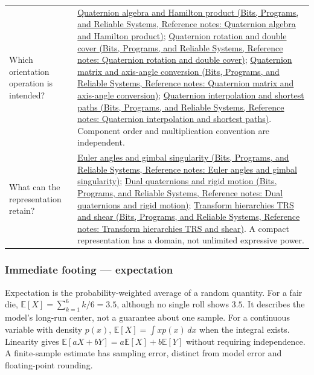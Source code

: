 {\begin{longtable}[]{@{}
  >{\raggedright\arraybackslash}p{}
  >{\raggedright\arraybackslash}p{}@{}}
Which orientation operation is intended? & \href{../01-Bits-Programs-and-Reliable-Systems/main.pdf\#nameddest=appendix-965d9260eeab}{Quaternion algebra and Hamilton product (Bits, Programs, and Reliable Systems, Reference notes: Quaternion algebra and Hamilton product)}; \href{../01-Bits-Programs-and-Reliable-Systems/main.pdf\#nameddest=appendix-8e61ab68f6b2}{Quaternion rotation and double cover (Bits, Programs, and Reliable Systems, Reference notes: Quaternion rotation and double cover)}; \href{../01-Bits-Programs-and-Reliable-Systems/main.pdf\#nameddest=appendix-26d8da71f6c4}{Quaternion matrix and axis-angle conversion (Bits, Programs, and Reliable Systems, Reference notes: Quaternion matrix and axis-angle conversion)}; \href{../01-Bits-Programs-and-Reliable-Systems/main.pdf\#nameddest=appendix-9b4b8254f26b}{Quaternion interpolation and shortest paths (Bits, Programs, and Reliable Systems, Reference notes: Quaternion interpolation and shortest paths)}. Component order and multiplication convention are independent. \\
What can the representation retain? & \href{../01-Bits-Programs-and-Reliable-Systems/main.pdf\#nameddest=appendix-5f723fbd0593}{Euler angles and gimbal singularity (Bits, Programs, and Reliable Systems, Reference notes: Euler angles and gimbal singularity)}; \href{../01-Bits-Programs-and-Reliable-Systems/main.pdf\#nameddest=appendix-d1ea57347893}{Dual quaternions and rigid motion (Bits, Programs, and Reliable Systems, Reference notes: Dual quaternions and rigid motion)}; \href{../01-Bits-Programs-and-Reliable-Systems/main.pdf\#nameddest=appendix-292c061cd47c}{Transform hierarchies TRS and shear (Bits, Programs, and Reliable Systems, Reference notes: Transform hierarchies TRS and shear)}. A compact representation has a domain, not unlimited expressive power. \\
\end{longtable}
}

\subsubsection{Immediate footing --- expectation}\label{01-foundations-i-ch018-immediate-footing-expectation}

Expectation is the probability-weighted average of a random quantity. For a fair die, \(\mathbb{E}[X]=\sum_{k=1}^6 k/6=3.5\), although no single roll shows \(3.5\). It describes the model's long-run center, not a guarantee about one sample. For a continuous variable with density \(p(x)\), \(\mathbb{E}[X]=\int x p(x)\,dx\) when the integral exists. Linearity gives \(\mathbb{E}[aX+bY]=a\mathbb{E}[X]+b\mathbb{E}[Y]\) without requiring independence. A finite-sample estimate has sampling error, distinct from model error and floating-point rounding.

